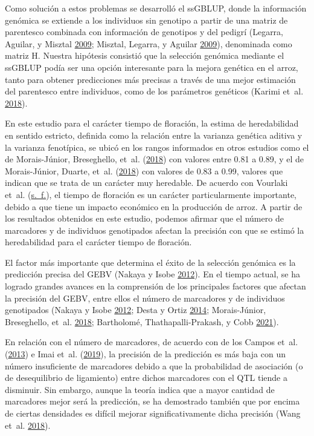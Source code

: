 \documentclass[11pt,spanish,a4paper,oneside,]{book} %
\begin{document}
Como solución a estos problemas se desarrolló el ssGBLUP, donde la información genómica se extiende a los individuos sin genotipo a partir de una matriz de parentesco combinada con información de genotipos y del pedigrí (Legarra, Aguilar, y Misztal \protect\hyperlink{ref-cite:17}{2009}; Misztal, Legarra, y Aguilar \protect\hyperlink{ref-cite:16}{2009}), denominada como matriz H. Nuestra hipótesis consistió que la selección genómica mediante el ssGBLUP podía ser una opción interesante para la mejora genética en el arroz, tanto para obtener predicciones más precisas a través de una mejor estimación del parentesco entre individuos, como de los parámetros genéticos (Karimi et~al. \protect\hyperlink{ref-cite:76}{2018}).

En este estudio para el carácter tiempo de floración, la estima de heredabilidad en sentido estricto, definida como la relación entre la varianza genética aditiva y la varianza fenotípica, se ubicó en los rangos informados en otros estudios como el de Morais-Júnior, Breseghello, et~al. (\protect\hyperlink{ref-cite:68}{2018}) con valores entre 0.81 a 0.89, y el de Morais-Júnior, Duarte, et~al. (\protect\hyperlink{ref-cite:69}{2018}) con valores de 0.83 a 0.99, valores que indican que se trata de un carácter muy heredable. De acuerdo con Vourlaki et~al. (\protect\hyperlink{ref-cite:26}{s.~f.}), el tiempo de floración es un carácter particularmente importante, debido a que tiene un impacto económico en la producción de arroz. A partir de los resultados obtenidos en este estudio, podemos afirmar que el número de marcadores y de individuos genotipados afectan la precisión con que se estimó la heredabilidad para el carácter tiempo de floración.

El factor más importante que determina el éxito de la selección genómica es la predicción precisa del GEBV (Nakaya y Isobe \protect\hyperlink{ref-cite:6}{2012}). En el tiempo actual, se ha logrado grandes avances en la comprensión de los principales factores que afectan la precisión del GEBV, entre ellos el número de marcadores y de individuos genotipados (Nakaya y Isobe \protect\hyperlink{ref-cite:6}{2012}; Desta y Ortiz \protect\hyperlink{ref-cite:10}{2014}; Morais-Júnior, Breseghello, et~al. \protect\hyperlink{ref-cite:68}{2018}; Bartholomé, Thathapalli-Prakash, y Cobb \protect\hyperlink{ref-cite:58}{2021}).

En relación con el número de marcadores, de acuerdo con de los Campos et~al. (\protect\hyperlink{ref-cite:31}{2013}) e Imai et~al. (\protect\hyperlink{ref-cite:20}{2019}), la precisión de la predicción es más baja con un número insuficiente de marcadores debido a que la probabilidad de asociación (o de desequilibrio de ligamiento) entre dichos marcadores con el QTL tiende a disminuir. Sin embargo, aunque la teoría indica que a mayor cantidad de marcadores mejor será la predicción, se ha demostrado también que por encima de ciertas densidades es difícil mejorar significativamente dicha precisión (Wang et~al. \protect\hyperlink{ref-cite:77}{2018}).
\end{document}
